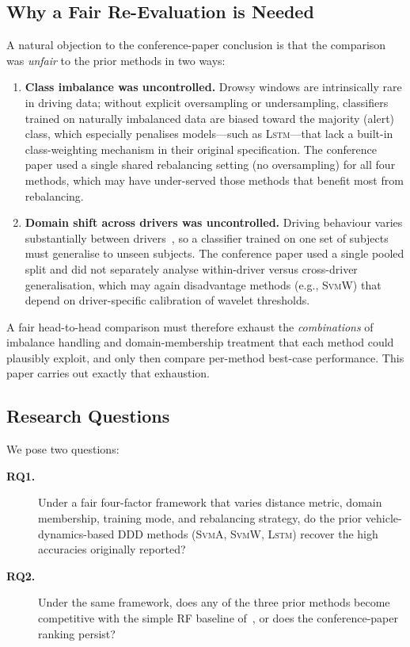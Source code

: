 \documentclass[lettersize,journal]{IEEEtran}
\newcommand{\Impl}[1]{\textsc{#1}}
\begin{document}
\subsection{Why a Fair Re-Evaluation is Needed}
A natural objection to the conference-paper conclusion is that the comparison was \emph{unfair} to the prior methods in two ways:
\begin{enumerate}
\item \textbf{Class imbalance was uncontrolled.}
Drowsy windows are intrinsically rare in driving data; without explicit oversampling or undersampling, classifiers trained on naturally imbalanced data are biased toward the majority (alert) class, which especially penalises models---such as \Impl{Lstm}---that lack a built-in class-weighting mechanism in their original specification.
The conference paper used a single shared rebalancing setting (no oversampling) for all four methods, which may have under-served those methods that benefit most from rebalancing.
\item \textbf{Domain shift across drivers was uncontrolled.}
Driving behaviour varies substantially between drivers~\cite{schwarz2019,baccour2022}, so a classifier trained on one set of subjects must generalise to unseen subjects.
The conference paper used a single pooled split and did not separately analyse within-driver versus cross-driver generalisation, which may again disadvantage methods (e.g., \Impl{SvmW}) that depend on driver-specific calibration of wavelet thresholds.
\end{enumerate}
A fair head-to-head comparison must therefore exhaust the \emph{combinations} of imbalance handling and domain-membership treatment that each method could plausibly exploit, and only then compare per-method best-case performance.
This paper carries out exactly that exhaustion.

\subsection{Research Questions}
We pose two questions:
\begin{description}
\item[\textbf{RQ1.}] Under a fair four-factor framework that varies distance metric, domain membership, training mode, and rebalancing strategy, do the prior vehicle-dynamics-based DDD methods (\Impl{SvmA}, \Impl{SvmW}, \Impl{Lstm}) recover the high accuracies originally reported?
\item[\textbf{RQ2.}] Under the same framework, does any of the three prior methods become competitive with the simple \Impl{RF} baseline of~\cite{nakagama2025iv}, or does the conference-paper ranking persist?
\end{description}
\end{document}
